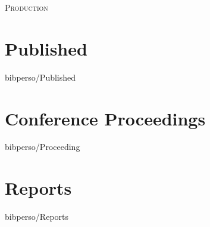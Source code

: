\documentclass[12pt]{article}
\newcommand{\maintitle}[1]{\begin{center}\textsc{\Large #1}\par\vspace{0.5cm}\end{center}}
\begin{document}
\maintitle{Production}

\nocite{*}

\section*{Published}
\begin{btSect}{bibperso/Published}
  \btPrintAll
\end{btSect}


\section*{Conference Proceedings}
\begin{btSect}{bibperso/Proceeding}
  \btPrintAll
\end{btSect}

\section*{Reports}
\begin{btSect}{bibperso/Reports}
  \btPrintAll
\end{btSect}

\end{document}
